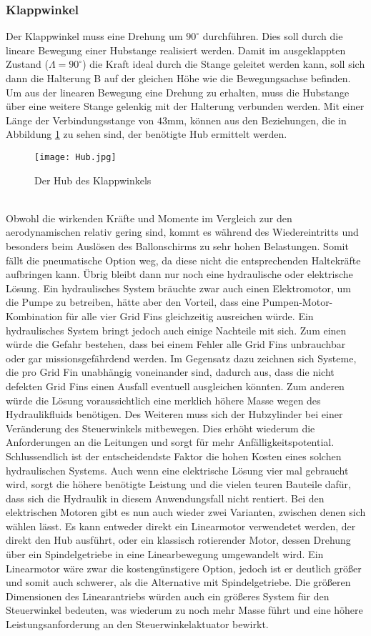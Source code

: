 \subsubsection{Klappwinkel}
Der Klappwinkel muss eine Drehung um $90^\circ$ durchführen. Dies soll durch die lineare Bewegung einer Hubstange realisiert werden. Damit im ausgeklappten Zustand ($\Lambda = 90^\circ$) die Kraft ideal durch die Stange geleitet werden kann, soll sich dann die Halterung B auf der gleichen Höhe wie die Bewegungsachse befinden. Um aus der linearen Bewegung eine Drehung zu erhalten, muss die Hubstange über eine weitere Stange gelenkig mit der Halterung verbunden werden. Mit einer Länge der Verbindungsstange von $43$mm, können aus den Beziehungen, die in Abbildung \ref{abb_hub} zu sehen sind, der benötigte Hub ermittelt werden.
\begin{figure}[h]
	\centering
	\texttt{[image: Hub.jpg]}
	\caption{Der Hub des Klappwinkels}
	\label{abb_hub}
\end{figure}\\
Obwohl die wirkenden Kräfte und Momente im Vergleich zur den aerodynamischen relativ gering sind, kommt es während des Wiedereintritts und besonders beim Auslösen des Ballonschirms zu sehr hohen Belastungen. Somit fällt die pneumatische Option weg, da diese nicht die entsprechenden Haltekräfte aufbringen kann. Übrig bleibt dann nur noch eine hydraulische oder elektrische Lösung. Ein hydraulisches System bräuchte zwar auch einen Elektromotor, um die Pumpe zu betreiben, hätte aber den Vorteil, dass eine Pumpen-Motor-Kombination für alle vier Grid Fins gleichzeitig ausreichen würde. Ein hydraulisches System bringt jedoch auch einige Nachteile mit sich. Zum einen würde die Gefahr bestehen, dass bei einem Fehler alle Grid Fins unbrauchbar oder gar missionsgefährdend werden. Im Gegensatz dazu zeichnen sich Systeme, die pro Grid Fin unabhängig voneinander sind, dadurch aus, dass die nicht defekten Grid Fins einen Ausfall eventuell ausgleichen könnten. Zum anderen würde die Lösung voraussichtlich eine merklich höhere Masse wegen des Hydraulikfluids benötigen. Des Weiteren muss sich der Hubzylinder bei einer Veränderung des Steuerwinkels mitbewegen. Dies erhöht wiederum die Anforderungen an die Leitungen und sorgt für mehr Anfälligkeitspotential. Schlussendlich ist der entscheidendste Faktor die hohen Kosten eines solchen hydraulischen Systems. Auch wenn eine elektrische Lösung vier mal gebraucht wird, sorgt die höhere benötigte Leistung und die vielen teuren Bauteile dafür, dass sich die Hydraulik in diesem Anwendungsfall nicht rentiert. Bei den elektrischen Motoren gibt es nun auch wieder zwei Varianten, zwischen denen sich wählen lässt. Es kann entweder direkt ein Linearmotor verwendetet werden, der direkt den Hub ausführt, oder ein klassisch rotierender Motor, dessen Drehung über ein Spindelgetriebe in eine Linearbewegung umgewandelt wird. Ein Linearmotor wäre zwar die kostengünstigere Option, jedoch ist er deutlich größer und somit auch schwerer, als die Alternative mit Spindelgetriebe. Die größeren Dimensionen des Linearantriebs würden auch ein größeres System für den Steuerwinkel bedeuten, was wiederum zu noch mehr Masse führt und eine höhere Leistungsanforderung an den Steuerwinkelaktuator bewirkt.
